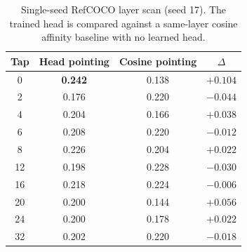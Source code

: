 \documentclass[11pt,a4paper]{article}
\begin{document}
\begin{table}[htbp]
\caption{Robustness to cluster-count misspecification at $\sigma=0.2$ with $K_{\mathrm{true}}=8$. Means and standard deviations are over 10 seeds.}
\label{tab:kmismatch}
\centering
\footnotesize
\setlength{\tabcolsep}{3pt}
\end{table}

\begin{table}[htbp]
\caption{Single-seed RefCOCO layer scan (seed 17). The trained head is compared against a same-layer cosine affinity baseline with no learned head.}
\label{tab:layertap_scan}
\centering
\footnotesize
\setlength{\tabcolsep}{3pt}
\begin{tabular}{@{}cccc@{}}
\toprule
Tap & Head pointing & Cosine pointing & $\Delta$ \\
\midrule
0 & \textbf{0.242} & 0.138 & $+0.104$ \\
2 & 0.176 & 0.220 & $-0.044$ \\
4 & 0.204 & 0.166 & $+0.038$ \\
6 & 0.208 & 0.220 & $-0.012$ \\
8 & 0.226 & 0.204 & $+0.022$ \\
12 & 0.198 & 0.228 & $-0.030$ \\
16 & 0.218 & 0.224 & $-0.006$ \\
20 & 0.200 & 0.144 & $+0.056$ \\
24 & 0.200 & 0.178 & $+0.022$ \\
32 & 0.202 & 0.220 & $-0.018$ \\
\bottomrule
\end{tabular}
\end{table}
\end{document}
